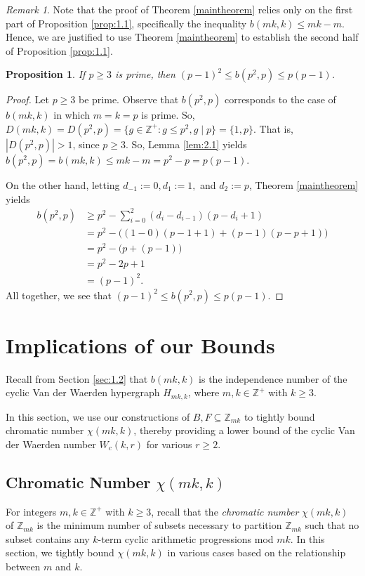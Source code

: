\documentclass{article}
\newtheorem{proposition}[theorem]{Proposition}
\theoremstyle{definition}
\theoremstyle{remark}
\newtheorem*{remark}{Remark}
\begin{document}
\begin{remark}
Note that the proof of Theorem \ref{maintheorem} relies only on the first part of Proposition \ref{prop:1.1}, specifically the inequality $b(mk,k) \leq mk-m$. Hence, we are justified to use Theorem \ref{maintheorem} to establish the second half of Proposition \ref{prop:1.1}.
\end{remark}

\begin{proposition}
    If $p \geq 3$ is prime, then $(p-1)^2 \leq b(p^2,p) \leq p(p-1)$.
\end{proposition}

\begin{proof}
   Let $p \geq 3$ be prime. Observe that $b(p^2,p)$ corresponds to the case of $b(mk,k)$ in which $m=k=p$ is prime. So, $D(mk,k) = D(p^2,p) = \{g \in \mathbb{Z}^+ : g \leq p^2, g \mid p\} = \{1,p\}$. That is, $|D(p^2,p)| > 1$, since $p \geq 3$. So, Lemma \ref{lem:2.1} yields $b(p^2,p) = b(mk,k) \leq mk-m = p^2-p = p(p-1)$.

   On the other hand, letting $d_{-1} := 0, d_{1} := 1,$ and $d_2 := p$, Theorem \ref{maintheorem} yields \begin{align*}
       b(p^2,p) &\geq p^2-\sum_{i=0}^{2}(d_i-d_{i-1})(p-d_i+1) \\
       &= p^2-\Big((1-0)(p-1+1)+(p-1)(p-p+1) \Big ) \\
       &= p^2-\Big(p+(p-1)\Big) \\
       &= p^2-2p+1 \\
       &= (p-1)^2.
   \end{align*} All together, we see that $(p-1)^2 \leq b(p^2,p) \leq p(p-1)$.
\end{proof}

\section{Implications of our Bounds}\label{sec:implications}
Recall from Section \ref{sec:1.2} that $b(mk,k)$ is the independence number of the cyclic Van der Waerden hypergraph $H_{mk,k}$, where $m,k \in \mathbb{Z}^+$ with $k \geq 3$.

In this section, we use our constructions of $B,F \subseteq \mathbb{Z}_{mk}$ to tightly bound chromatic number $\chi(mk,k)$, thereby providing a lower bound of the cyclic Van der Waerden number $W_c(k,r)$ for various $r \geq 2$.

\subsection{Chromatic Number $\chi(mk,k)$}
For integers $m,k \in \mathbb{Z}^+$ with $k \geq 3$, recall that the \textit{chromatic number} $\chi(mk,k)$ of $\mathbb{Z}_{mk}$ is the minimum number of subsets necessary to partition $\mathbb{Z}_{mk}$ such that no subset contains any $k$-term cyclic arithmetic progressions mod $mk$. In this section, we tightly bound $\chi(mk,k)$ in various cases based on the relationship between $m$ and $k$.
\end{document}
